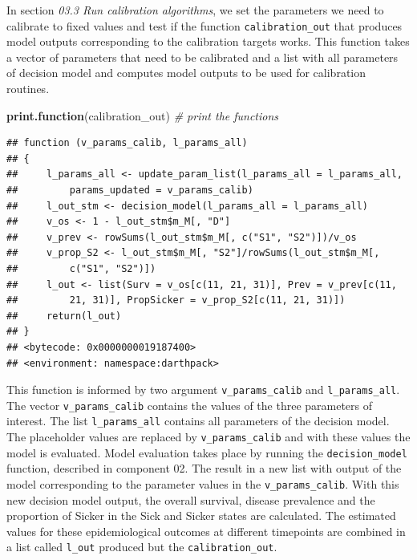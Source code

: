 \documentclass[]{book}
\newenvironment{Shaded}{\begin{snugshade}}{\end{snugshade}}
\newcommand{\CommentTok}[1]{\textcolor[rgb]{0.56,0.35,0.01}{\textit{#1}}}
\newcommand{\KeywordTok}[1]{\textcolor[rgb]{0.13,0.29,0.53}{\textbf{#1}}}
\newcommand{\NormalTok}[1]{#1}
\begin{document}
In section \emph{03.3 Run calibration algorithms}, we set the parameters we need to calibrate to fixed values and test if the function \texttt{calibration\_out} that produces model outputs corresponding to the calibration targets works. This function takes a vector of parameters that need to be calibrated and a list with all parameters of decision model and computes model outputs to be used for calibration routines.

\begin{Shaded}
\begin{Highlighting}[]
\KeywordTok{print.function}\NormalTok{(calibration_out) }\CommentTok{# print the functions}
\end{Highlighting}
\end{Shaded}

\begin{verbatim}
## function (v_params_calib, l_params_all) 
## {
##     l_params_all <- update_param_list(l_params_all = l_params_all, 
##         params_updated = v_params_calib)
##     l_out_stm <- decision_model(l_params_all = l_params_all)
##     v_os <- 1 - l_out_stm$m_M[, "D"]
##     v_prev <- rowSums(l_out_stm$m_M[, c("S1", "S2")])/v_os
##     v_prop_S2 <- l_out_stm$m_M[, "S2"]/rowSums(l_out_stm$m_M[, 
##         c("S1", "S2")])
##     l_out <- list(Surv = v_os[c(11, 21, 31)], Prev = v_prev[c(11, 
##         21, 31)], PropSicker = v_prop_S2[c(11, 21, 31)])
##     return(l_out)
## }
## <bytecode: 0x0000000019187400>
## <environment: namespace:darthpack>
\end{verbatim}

This function is informed by two argument \texttt{v\_params\_calib} and \texttt{l\_params\_all}. The vector \texttt{v\_params\_calib} contains the values of the three parameters of interest. The list \texttt{l\_params\_all} contains all parameters of the decision model. The placeholder values are replaced by \texttt{v\_params\_calib} and with these values the model is evaluated. Model evaluation takes place by running the \texttt{decision\_model} function, described in component 02. The result in a new list with output of the model corresponding to the parameter values in the \texttt{v\_params\_calib}. With this new decision model output, the overall survival, disease prevalence and the proportion of Sicker in the Sick and Sicker states are calculated. The estimated values for these epidemiological outcomes at different timepoints are combined in a list called \texttt{l\_out} produced but the \texttt{calibration\_out}.
\end{document}
